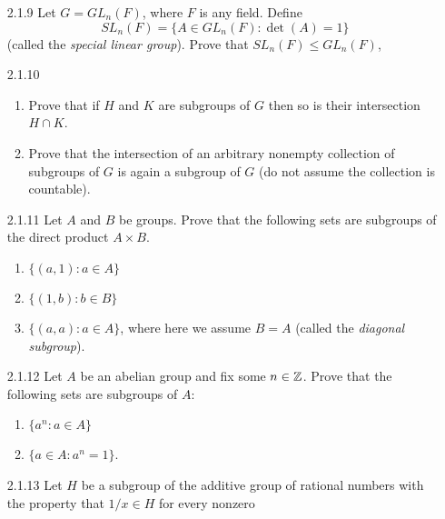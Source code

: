 \begin{enumerate}
   \item[2.1.9]   Let $G = GL_n(F)$, where $F$ is any field. Define
                  $$SL_n(F) = \{A \in GL_n(F) : \det(A) = 1\}$$
                  (called the \textit{special linear group}). Prove that
                  $SL_n(F) \le GL_n(F)$,
   \item[2.1.10]  \begin{enumerate}
                     \item Prove that if $H$ and $K$ are subgroups of $G$ then
                           so is their intersection $H \cap K$.
                     \item Prove that the intersection of an arbitrary nonempty
                           collection of subgroups of $G$ is again a subgroup of
                           $G$ (do not assume the collection is countable).
                  \end{enumerate}
   \item[2.1.11]  Let $A$ and $B$ be groups. Prove that the following sets are
                  subgroups of the direct product $A \times B$.
                  \begin{enumerate}
                     \item $\{(a, 1) : a \in A\}$
                     \item $\{(1, b) : b \in B\}$
                     \item $\{(a, a) : a \in A\}$, where here we assume $B = A$
                           (called the \textit{diagonal subgroup}).
                  \end{enumerate}
   \item[2.1.12]  Let $A$ be an abelian group and fix some $n \in \mathbb{Z}$. Prove
                  that the following sets are subgroups of $A$:
                  \begin{enumerate}
                     \item $\{a^n : a \in A\}$
                     \item $\{a \in A : a^n = 1\}$.
                  \end{enumerate}
   \item[2.1.13]  Let $H$ be a subgroup of the additive group of rational
                  numbers with the property that $1/x \in H$ for every nonzero

\end{enumerate}
